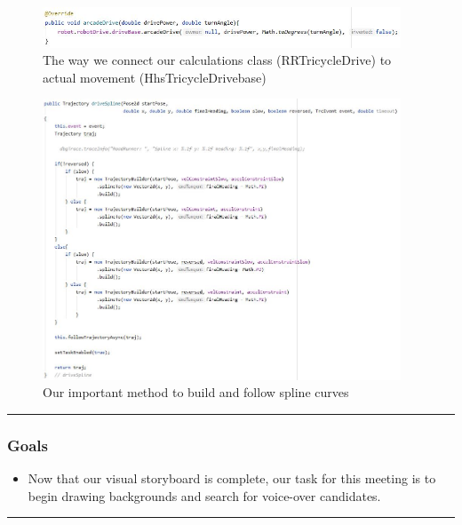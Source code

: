 \begin{figure}[htp]
\centering
\includegraphics[width=0.95\textwidth, angle=0]{Meetings/January/01-13-22/1-13-22 pic5 - James Hu.JPG}
\caption{The way we connect our calculations class (RRTricycleDrive) to actual movement (HhsTricycleDrivebase)}
\label{fig:011322_5}
\end{figure}

\begin{figure}[htp]
\centering
\includegraphics[width=0.95\textwidth, angle=0]{Meetings/January/01-13-22/1-13-22 pic6 - James Hu.JPG}
\caption{Our important method to build and follow spline curves}
\label{fig:011322_6}
\end{figure}

  
\noindent\hfil\rule{\textwidth}{.4pt}\hfil
\subsubsection*{Goals}
\begin{itemize}
    \item Now that our visual storyboard is complete, our task for this meeting is to begin drawing backgrounds and search for voice-over candidates.

\end{itemize} 

\noindent\hfil\rule{\textwidth}{.4pt}\hfil

